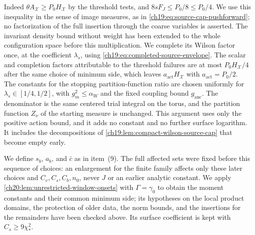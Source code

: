 Indeed $\theta A_{\mathcal X}\ge P_0H_{\mathcal X}$ by the threshold tests, and $8sF_J\le P_0/8\le P_0/4$. We use this inequality in the sense of image measures, as in \eqref{ch19:eq:source-cap-pushforward}; no factorization of the full insertion through the coarse variables is asserted. The invariant density bound without weight has been extended to the whole configuration space before this multiplication. We complete its Wilson factor once, at the coefficient $\lambda_s$, using \eqref{ch19:eq:completed-source-envelope}. The scalar and completion factors attributable to the threshold failures are at most $P_0H_{\mathcal X}/4$ after the same choice of minimum side, which leaves $a_{\mathrm{act}}H_{\mathcal X}$ with $a_{\mathrm{act}}=P_0/2$. The constants for the stopping partition-function ratio are chosen uniformly for $\lambda_s\in[1/4,1/2]$, with $g_m^2\le\alpha_W$ and the fixed coupling bound $g_{\mathrm{anc}}$. The denominator is the same centered trial integral on the torus, and the partition function $Z_\nu$ of the starting measure is unchanged. This argument uses only the positive action bound, and it adds no constant and no further surface logarithm. It includes the decompositions of \cref{ch19:lem:compact-wilson-source-cap} that become empty early.

We define $s_b$, $a_b$, and $\bar c$ as in item~(9). The full affected sets were fixed before this sequence of choices: an enlargement for the finite family affects only these later choices and $C_v,C_s,C_b,n_0$, never $J$ or an earlier analytic constant. We apply \cref{ch20:lem:unrestricted-window-onsets} with $\Gamma=\gamma_0$ to obtain the moment constants and their common minimum side; its hypotheses on the local product domains, the protection of older data, the norm bounds, and the insertions for the remainders have been checked above. Its surface coefficient is kept with $C_s\ge9\chi_*^2$.

